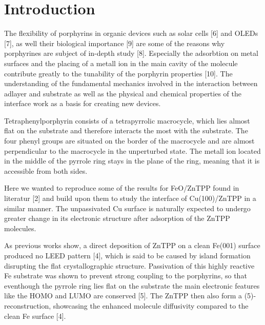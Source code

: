 \chapter{Introduction}
The flexibility of porphyrins in organic devices such as solar cells [6] and OLEDs [7], as well their biological importance [9] are some of the reasons why porphyrines are subject of in-depth study [8].
Especially the adsorbtion on metal surfaces and the placing of a metall ion in the main cavity of the molecule contribute greatly to the tunability of the porphyrin properties [10].
The understanding of the fundamental mechanics involved in the interaction between adlayer and substrate as well as the physical and chemical properties of the interface work as a basis for creating new devices.

Tetraphenylporphyrin consists of a tetrapyrrolic macrocycle, which lies almost flat on the substrate and therefore interacts the most with the substrate.
The four phenyl groups are situated on the border of the macrocycle and are almost perpendicular to the macrocycle in the unperturbed state.
The metall ion located in the middle of the pyrrole ring stays in the plane of the ring, meaning that it is accessible from both sides.

Here we wanted to reproduce some of the results for FeO/ZnTPP found in literatur [2] and build upon them to study the interface of Cu(100)/ZnTPP in a similar manner.
The unpassivated Cu surface is naturally expected to undergo greater change in its electronic structure after adsorption of the ZnTPP molecules.

As previous works show, a direct deposition of ZnTPP on a clean Fe(001) surface produced no LEED pattern [4], which is said to be caused by island formation disrupting the flat crystallographic structure.
Passivation of this highly reactive Fe substrate was shown to prevent strong coupling to the porphyrins, so that eventhough the pyrrole ring lies flat on the substrate the main electronic features like the HOMO and LUMO are conserved [5].
The ZnTPP then also form a (5)-reconstruction, showcasing the enhanced molecule diffusivity compared to the clean Fe surface [4].
